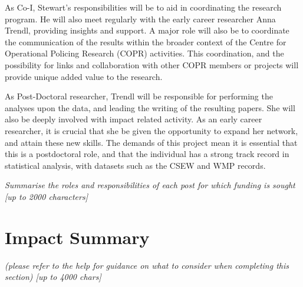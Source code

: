 \documentclass[11pt, a4paper]{article}
\begin{document}
As Co-I, Stewart's responsibilities will be to aid in coordinating the research program. He will also meet regularly with the early career researcher Anna Trendl, providing insights and support. A major role will also be to coordinate the communication of the results within the broader context of the Centre for Operational Policing Research (COPR) activities. This coordination, and the possibility for links and collaboration with other COPR members or projects will provide unique added value to the research. 

As Post-Doctoral researcher, Trendl will be responsible for performing the analyses upon the data, and leading the writing of the resulting papers. She will also be deeply involved with impact related activity. As an early career researcher, it is crucial that she be given the opportunity to expand her network, and attain these new skills. The demands of this project mean it is essential that this is a postdoctoral role, and that the individual has a strong track record in statistical analysis, with datasets such as the CSEW and WMP records. 

\textit{Summarise the roles and responsibilities of each post for which funding is sought [up to 2000 characters]}

\section{Impact Summary }

%
%
%
%
%
%
%
%



\textit{(please refer to the help for guidance on what to consider when completing this section) [up to 4000 chars]}
\end{document}
